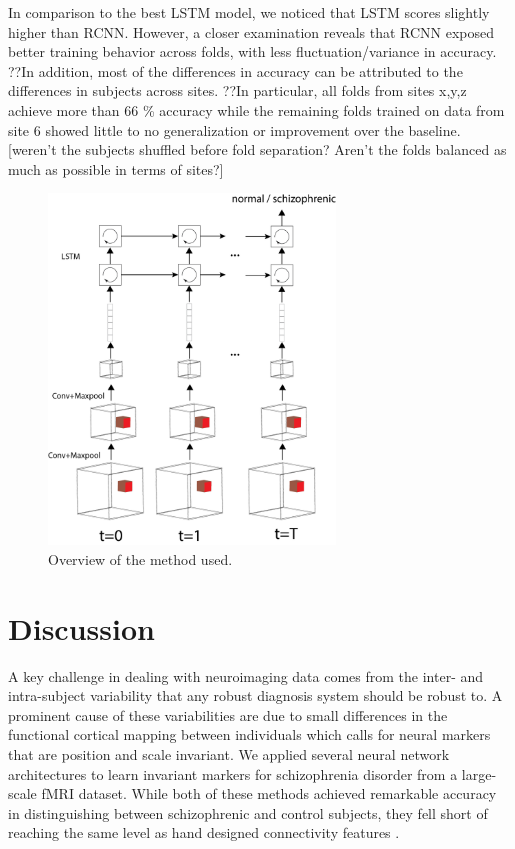 \documentclass{article}
\begin{document}
In comparison to the best LSTM model, we noticed that LSTM scores slightly higher than RCNN. However, a closer examination reveals that RCNN exposed better training behavior across folds, with less fluctuation/variance in accuracy. ??In addition, most of the differences in accuracy can be attributed to the differences in subjects across sites. ??In particular, all folds from sites x,y,z achieve more than 66 \% accuracy while the remaining folds trained on data from site 6 showed little to no generalization or improvement over the baseline. [weren't the subjects shuffled before fold separation? Aren't the folds balanced as much as possible in terms of sites?]

\begin{figure}[t]
\begin{center}
\includegraphics[width=3in]{figures/overview.png}
\end{center}
\caption{Overview of the method used.}
\label{fig1}
\end{figure}

\section{Discussion}

A key challenge in dealing with neuroimaging data comes from the inter- and intra-subject variability that any robust diagnosis system should be robust to. A prominent cause of these variabilities are due to small differences in the functional cortical mapping between individuals which calls for neural markers that are position and scale invariant. We applied several neural network architectures to learn invariant markers for schizophrenia disorder from a large-scale fMRI dataset. While both of these methods achieved remarkable accuracy in distinguishing between schizophrenic and control subjects, they fell short of reaching the same level as hand designed connectivity features \citep{Gheiratmand2017}.
\end{document}
